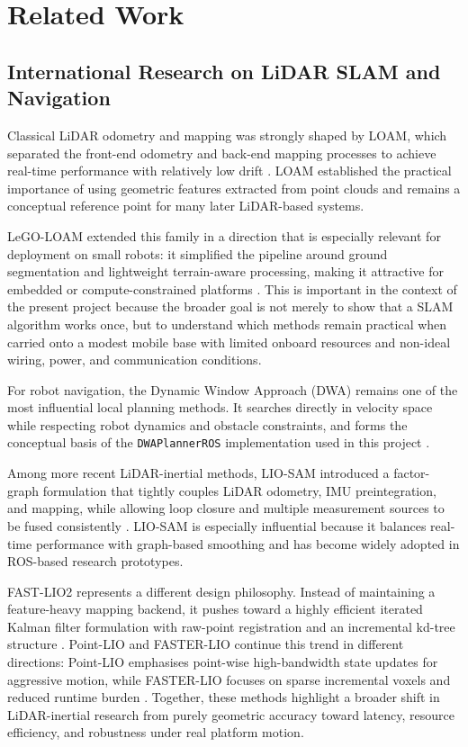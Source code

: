 \documentclass[12pt,a4paper]{report}
\begin{document}
\chapter{Related Work}

\section{International Research on LiDAR SLAM and Navigation}
Classical LiDAR odometry and mapping was strongly shaped by LOAM, which separated the front-end odometry and back-end mapping processes to achieve real-time performance with relatively low drift \citep{zhang2017loam}. LOAM established the practical importance of using geometric features extracted from point clouds and remains a conceptual reference point for many later LiDAR-based systems.

LeGO-LOAM extended this family in a direction that is especially relevant for deployment on small robots: it simplified the pipeline around ground segmentation and lightweight terrain-aware processing, making it attractive for embedded or compute-constrained platforms \citep{shan2018legoloam}. This is important in the context of the present project because the broader goal is not merely to show that a SLAM algorithm works once, but to understand which methods remain practical when carried onto a modest mobile base with limited onboard resources and non-ideal wiring, power, and communication conditions.

For robot navigation, the Dynamic Window Approach (DWA) remains one of the most influential local planning methods. It searches directly in velocity space while respecting robot dynamics and obstacle constraints, and forms the conceptual basis of the \texttt{DWAPlannerROS} implementation used in this project \citep{fox1997dwa}.

Among more recent LiDAR-inertial methods, LIO-SAM introduced a factor-graph formulation that tightly couples LiDAR odometry, IMU preintegration, and mapping, while allowing loop closure and multiple measurement sources to be fused consistently \citep{shan2020liosam}. LIO-SAM is especially influential because it balances real-time performance with graph-based smoothing and has become widely adopted in ROS-based research prototypes.

FAST-LIO2 represents a different design philosophy. Instead of maintaining a feature-heavy mapping backend, it pushes toward a highly efficient iterated Kalman filter formulation with raw-point registration and an incremental kd-tree structure \citep{xu2022fastlio2}. Point-LIO and FASTER-LIO continue this trend in different directions: Point-LIO emphasises point-wise high-bandwidth state updates for aggressive motion, while FASTER-LIO focuses on sparse incremental voxels and reduced runtime burden \citep{he2023pointlio,bai2022fasterlio}. Together, these methods highlight a broader shift in LiDAR-inertial research from purely geometric accuracy toward latency, resource efficiency, and robustness under real platform motion.
\end{document}
